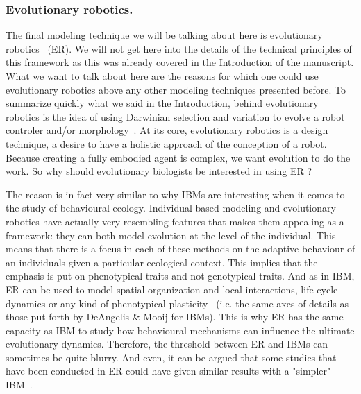     \subsubsection{Evolutionary robotics.} The final modeling technique we will be talking about here is evolutionary robotics~\parencite{Nolfi2000, Doncieux2015a} (ER). We will not get here into the details of the technical principles of this framework as this was already covered in the Introduction of the manuscript. What we want to talk about here are the reasons for which one could use evolutionary robotics above any other modeling techniques presented before. To summarize quickly what we said in the Introduction, behind evolutionary robotics is the idea of using Darwinian selection and variation to evolve a robot controler and/or morphology~\parencite{Floreano2010, Doncieux2014}. At its core, evolutionary robotics is a design technique, a desire to have a holistic approach of the conception of a robot. Because creating a fully embodied agent is complex, we want evolution to do the work. So why should evolutionary biologists be interested in using ER ?

    The reason is in fact very similar to why IBMs are interesting when it comes to the study of behavioural ecology. Individual-based modeling and evolutionary robotics have actually very resembling features that makes them appealing as a framework: they can both model evolution at the level of the individual. This means that there is a focus in each of these methods on the adaptive behaviour of an individuals given a particular ecological context. This implies that the emphasis is put on phenotypical traits and not genotypical traits. And as in IBM, ER can be used to model spatial organization and local interactions, life cycle dynamics or any kind of phenotypical plasticity~\parencite{Mitri2012} (i.e. the same axes of details as those put forth by DeAngelis \& Mooij for IBMs). This is why ER has the same capacity as IBM to study how behavioural mechanisms can influence the ultimate evolutionary dynamics. Therefore, the threshold between ER and IBMs can sometimes be quite blurry. And even, it can be argued that some studies that have been conducted in ER could have given similar results with a "simpler" IBM~\parencite{Mitri2012}.

